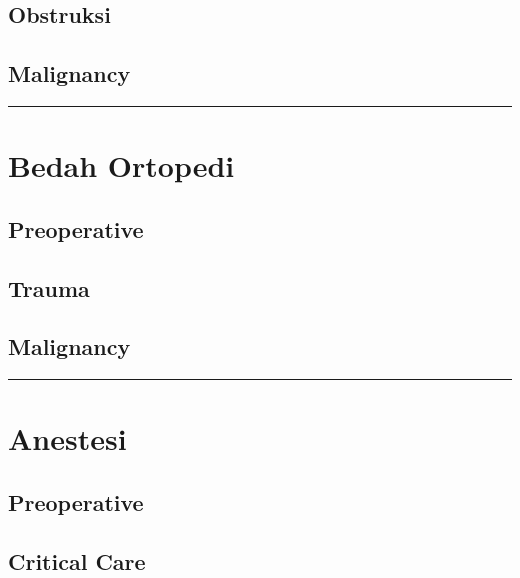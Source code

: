\documentclass[
]{book}
\begin{document}
\hypertarget{obstruksi-2}{%
\subsection{Obstruksi}\label{obstruksi-2}}

\hypertarget{malignancy-1}{%
\subsection{Malignancy}\label{malignancy-1}}

\begin{center}\rule{0.5\linewidth}{0.5pt}\end{center}

\hypertarget{bedah-ortopedi}{%
\section{Bedah Ortopedi}\label{bedah-ortopedi}}

\hypertarget{preoperative}{%
\subsection{Preoperative}\label{preoperative}}

\hypertarget{trauma}{%
\subsection{Trauma}\label{trauma}}

\hypertarget{malignancy-2}{%
\subsection{Malignancy}\label{malignancy-2}}

\begin{center}\rule{0.5\linewidth}{0.5pt}\end{center}

\hypertarget{anestesi-1}{%
\section{Anestesi}\label{anestesi-1}}

\hypertarget{preoperative-1}{%
\subsection{Preoperative}\label{preoperative-1}}

\hypertarget{critical-care}{%
\subsection{Critical Care}\label{critical-care}}
\end{document}
